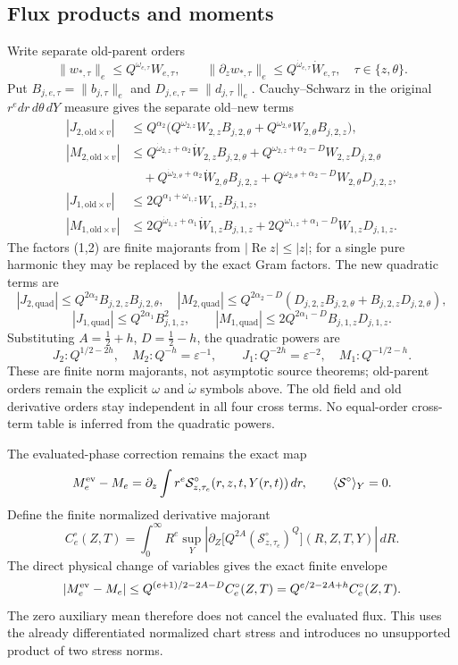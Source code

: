 \subsection{Flux products and moments}
Write separate old-parent orders
\[
\|w_{*,\tau}\|_e\le Q^{\omega_{e,\tau}}W_{e,\tau},\qquad
\|\partial_zw_{*,\tau}\|_e\le Q^{\dot\omega_{e,\tau}}\dot W_{e,\tau},
\quad \tau\in\{z,\theta\}.
\]
Put \(B_{j,e,\tau}=\|b_{j,\tau}\|_e\) and
\(D_{j,e,\tau}=\|d_{j,\tau}\|_e\).  Cauchy--Schwarz in the original
\(r^e dr\,d\theta\,dY\) measure gives the separate old--new terms
\[
\begin{aligned}
|J_{2,\mathrm{old}\times v}|&\le Q^{\alpha_2}\bigl(Q^{\omega_{2,z}}W_{2,z}B_{j,2,\theta}
 +Q^{\omega_{2,\theta}}W_{2,\theta}B_{j,2,z}\bigr),\\
|M_{2,\mathrm{old}\times v}|&\le Q^{\dot\omega_{2,z}+\alpha_2}\dot W_{2,z}B_{j,2,\theta}
 +Q^{\omega_{2,z}+\alpha_2-D}W_{2,z}D_{j,2,\theta}\\
&\quad +Q^{\dot\omega_{2,\theta}+\alpha_2}\dot W_{2,\theta}B_{j,2,z}
 +Q^{\omega_{2,\theta}+\alpha_2-D}W_{2,\theta}D_{j,2,z},\\
|J_{1,\mathrm{old}\times v}|&\le 2Q^{\alpha_1+\omega_{1,z}}W_{1,z}B_{j,1,z},\\
|M_{1,\mathrm{old}\times v}|&\le 2Q^{\dot\omega_{1,z}+\alpha_1}\dot W_{1,z}B_{j,1,z}
 +2Q^{\omega_{1,z}+\alpha_1-D}W_{1,z}D_{j,1,z}.
\end{aligned}
\]
The factors (1,2) are finite majorants from
\(|\operatorname{Re}z|\le|z|\); for a single pure harmonic they may be
replaced by the exact Gram factors.  The new quadratic terms are
\[
|J_{2,\mathrm{quad}}|\le Q^{2\alpha_2}B_{j,2,z}B_{j,2,\theta},\quad
|M_{2,\mathrm{quad}}|\le Q^{2\alpha_2-D}(D_{j,2,z}B_{j,2,\theta}+B_{j,2,z}D_{j,2,\theta}),
\]
\[
|J_{1,\mathrm{quad}}|\le Q^{2\alpha_1}B_{j,1,z}^2,\qquad
|M_{1,\mathrm{quad}}|\le 2Q^{2\alpha_1-D}B_{j,1,z}D_{j,1,z}.
\]
Substituting \(A=\tfrac12+h\), \(D=\tfrac12-h\), the quadratic powers are
\[
J_2:Q^{1/2-2h},\quad M_2:Q^{-h}=\varepsilon^{-1},\qquad
J_1:Q^{-2h}=\varepsilon^{-2},\quad M_1:Q^{-1/2-h}.
\]
These are finite norm majorants, not asymptotic source theorems; old-parent
orders remain the explicit \(\omega\) and \(\dot\omega\) symbols above.
The old field and old derivative orders stay independent in all four cross terms. No equal-order cross-term table is inferred from the quadratic powers.

The evaluated-phase correction remains the exact map
\[
M_e^{\rm ev}-M_e=\partial_z\int r^e
 \mathcal S^\circ_{z,\tau_e}(r,z,t,Y(r,t))\,dr,\qquad
 \langle\mathcal S^\circ\rangle_Y=0 .
\]
Define the finite normalized derivative majorant
\[
C_e^\circ(Z,T)=\int_0^\infty R^e\sup_Y
 \left|\partial_Z\bigl[Q^{2A}(\mathcal S^\circ_{z,\tau_e})^Q\bigr](R,Z,T,Y)\right|\,dR .
\]
The direct physical change of variables gives the exact finite envelope
\[
|M_e^{\rm ev}-M_e|\le Q^{(e+1)/2-2A-D}C_e^\circ(Z,T)
 =Q^{e/2-2A+h}C_e^\circ(Z,T).
\]
The zero auxiliary mean therefore does not cancel the evaluated flux.  This
uses the already differentiated normalized chart stress and introduces no
unsupported product of two stress norms.

